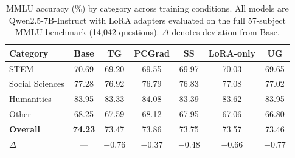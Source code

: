 \begin{table}[t]
\centering
\small
\caption{MMLU accuracy (\%) by category across training conditions. All models are Qwen2.5-7B-Instruct with LoRA adapters evaluated on the full 57-subject MMLU benchmark (14{,}042 questions). $\Delta$ denotes deviation from Base.}
\label{tab:mmlu_detail}
\begin{tabular}{@{}l cccccc@{}}
\toprule
\textbf{Category} & \textbf{Base} & \textbf{TG} & \textbf{PCGrad} & \textbf{SS} & \textbf{LoRA-only} & \textbf{UG} \\
\midrule
STEM           & 70.69 & 69.20 & 69.55 & 69.97 & 70.03 & 69.65 \\
Social Sciences & 77.28 & 76.92 & 76.79 & 76.83 & 77.08 & 77.02 \\
Humanities     & 83.95 & 83.33 & 84.08 & 83.39 & 83.62 & 83.95 \\
Other          & 68.25 & 67.59 & 68.12 & 67.95 & 67.06 & 66.80 \\
\midrule
\textbf{Overall} & \textbf{74.23} & 73.47 & 73.86 & 73.75 & 73.57 & 73.46 \\
$\Delta$ & --- & $-$0.76 & $-$0.37 & $-$0.48 & $-$0.66 & $-$0.77 \\
\bottomrule
\end{tabular}
\end{table}
